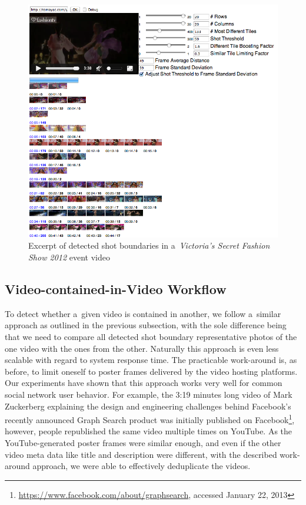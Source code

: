 \begin{figure}[!ht]
  \centering
  \includegraphics[width=1.0\linewidth]{./vsfashionshowboundaries.png}
  \caption[Excerpt of detected shot boundaries in an event video]
  {Excerpt of detected shot boundaries in a~\emph{Victoria's Secret Fashion Show 2012} event video}
  \label{fig:vsfashionshowboundaries}
\end{figure}

\subsection{Video-contained-in-Video Workflow}

To detect whether a~given video is contained in another,
we follow a~similar approach as outlined in the previous subsection,
with the sole difference being that we need to compare
all detected shot boundary representative photos of the one video
with the ones from the other.
Naturally this approach is even less scalable
with regard to system response time.
The practicable work-around is, as before, to limit oneself
to poster frames delivered by the video hosting platforms.
Our experiments have shown that this approach works very well
for common social network user behavior.
For example, the 3:19 minutes long video of Mark Zuckerberg explaining
the design and engineering challenges behind Facebook's
recently announced Graph Search product was initially published
on Facebook\footnote{\url{https://www.facebook.com/about/graphsearch},
accessed January 22, 2013}, however, people republished the same video 
multiple times on YouTube.
As the YouTube-generated poster frames were similar enough,
and even if the other video meta data like title and description
were different, with the described work-around approach,
we were able to effectively deduplicate the videos.

